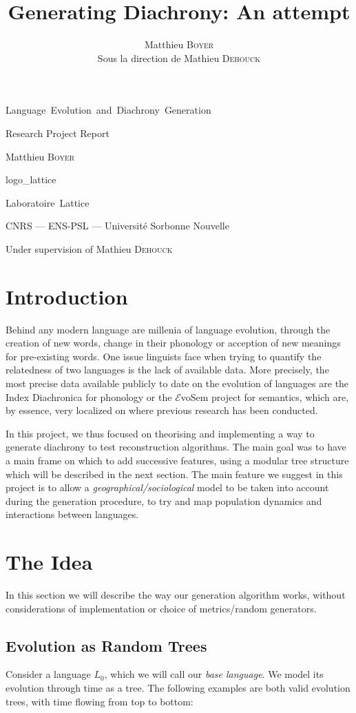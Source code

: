 \documentclass[math, info, english]{cours}
\title{Generating Diachrony: An attempt}
\author{Matthieu \textsc{Boyer}\\ \Small Sous la direction de Mathieu \textsc{Dehouck}}
\begin{document}
\titlepage %
{}
{\centering %
	{\Huge Language\, Evolution\, and\, Diachrony\, Generation\par}
	\vspace{16pt}
	{\Large Research Project Report\par}
	\vspace{24pt}
	{\huge Matthieu \textsc{Boyer}\par}}
{logo_lattice}
{\centering %
	{\huge\sc Laboratoire\, Lattice \par}
	\vspace{16pt}
	{\large \sc CNRS --- ENS-PSL --- Université Sorbonne Nouvelle\par}
	\vspace{24pt}
	{\Large Under supervision of Mathieu \textsc{Dehouck}\par}}

\section*{Introduction}
Behind any modern language are millenia of language evolution, through the creation of new words, change in their phonology or acception of new meanings for pre-existing words.
One issue linguists face when trying to quantify the relatedness of two languages is the lack of available data.
More precisely, the most precise data available publicly to date on the evolution of languages are the Index Diachronica \cite{index} for phonology or the $\mathcal{E}$voSem project \cite{evosem} for semantics, which are, by essence, very localized on where previous research has been conducted.

In this project, we thus focused on theorising and implementing a way to generate diachrony to test reconstruction algorithms.
The main goal was to have a main frame on which to add successive features, using a modular tree structure which will be described in the next section.
The main feature we suggest in this project is to allow a \emph{geographical/sociological} model to be taken into account during the generation procedure, to try and map population dynamics and interactions between languages.

\section{The Idea}
In this section we will describe the way our generation algorithm works, without considerations of implementation or choice of metrics/random generators.
\subsection{Evolution as Random Trees}
Consider a language $L_{0}$, which we will call our \emph{base language}.
We model its evolution through time as a tree. The following examples are both valid evolution trees, with time flowing from top to bottom:
\end{document}
